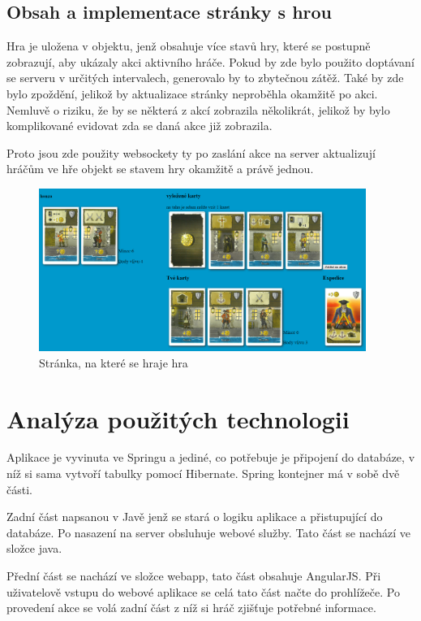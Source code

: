 \documentclass[czech,master,public,dept460,male,cpdeclaration,twoside]{diploma}
\begin{document}
\subsection{Obsah a implementace stránky s hrou}
Hra je uložena v objektu, jenž obsahuje více stavů hry, které se postupně zobrazují, aby ukázaly akci aktivního hráče.
Pokud by zde bylo použito doptávaní se serveru v určitých intervalech, generovalo by to zbytečnou zátěž. Také by zde bylo zpoždění, jelikož by aktualizace stránky neproběhla okamžitě po akci. Nemluvě o riziku, že by se některá z akcí zobrazila několikrát, jelikož by bylo komplikované evidovat zda se daná akce již zobrazila.

Proto jsou zde použity websockety ty po zaslání akce na server aktualizují hráčům ve hře objekt se stavem hry okamžitě a právě jednou.
\begin{figure}[H]
\centering\includegraphics[width=0.95\textwidth]{Figures/gamepage.png}\caption{Stránka, na které se hraje hra}
\end{figure}


\section{Analýza použitých technologii}
Aplikace je vyvinuta ve Springu a jediné, co potřebuje je připojení do databáze, v níž si sama vytvoří tabulky pomocí Hibernate. Spring kontejner má v sobě dvě části.

Zadní část napsanou v Javě jenž se stará o logiku aplikace a přistupující do databáze. Po nasazení na server obsluhuje webové služby. Tato část se nachází ve složce java. 

Přední část se nachází ve složce webapp, tato část obsahuje AngularJS. Při uživatelově vstupu do webové aplikace se celá tato část načte do prohlížeče. Po provedení akce se volá zadní část z níž si hráč zjišťuje potřebné informace.
\end{document}
